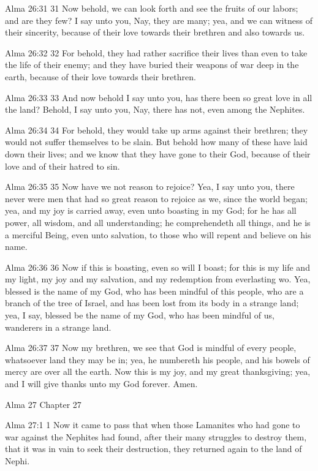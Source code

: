 Alma 26:31
 31 Now behold, we can look forth and see the fruits of our
labors; and are they few? I say unto you, Nay, they are many;
yea, and we can witness of their sincerity, because of their love
towards their brethren and also towards us.

Alma 26:32
 32 For behold, they had rather sacrifice their lives than even
to take the life of their enemy; and they have buried their
weapons of war deep in the earth, because of their love towards
their brethren.

Alma 26:33
 33 And now behold I say unto you, has there been so great love
in all the land? Behold, I say unto you, Nay, there has not,
even among the Nephites.

Alma 26:34
 34 For behold, they would take up arms against their brethren;
they would not suffer themselves to be slain. But behold how
many of these have laid down their lives; and we know that they
have gone to their God, because of their love and of their hatred
to sin.

Alma 26:35
 35 Now have we not reason to rejoice? Yea, I say unto you,
there never were men that had so great reason to rejoice as we,
since the world began; yea, and my joy is carried away, even unto
boasting in my God; for he has all power, all wisdom, and all
understanding; he comprehendeth all things, and he is a merciful
Being, even unto salvation, to those who will repent and believe
on his name.

Alma 26:36
 36 Now if this is boasting, even so will I boast; for this is my
life and my light, my joy and my salvation, and my redemption
from everlasting wo. Yea, blessed is the name of my God, who has
been mindful of this people, who are a branch of the tree of
Israel, and has been lost from its body in a strange land; yea, I
say, blessed be the name of my God, who has been mindful of us,
wanderers in a strange land.

Alma 26:37
 37 Now my brethren, we see that God is mindful of every people,
whatsoever land they may be in; yea, he numbereth his people, and
his bowels of mercy are over all the earth. Now this is my joy,
and my great thanksgiving; yea, and I will give thanks unto my
God forever. Amen.

Alma 27
Chapter 27

Alma 27:1
 1 Now it came to pass that when those Lamanites who had gone to
war against the Nephites had found, after their many struggles to
destroy them, that it was in vain to seek their destruction, they
returned again to the land of Nephi.

